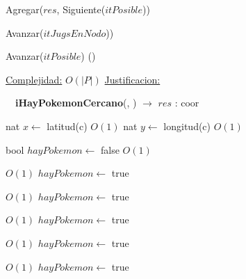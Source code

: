 \begin{Algoritmos}
\begin{algorithm}[H]
\begin{algorithmic}[1]
			\State Agregar($res$, Siguiente($itPosible$))
	
		\EndIf
		
		\State Avanzar($itJugsEnNodo$))
	
	\EndWhile
	
	\State Avanzar($itPosible$)   \Comment()



\EndWhile


\medskip
\State \underline{Complejidad:} $O(|P|)$
\State \underline{Justificacion:} 

\end{algorithmic}
\end{algorithm}


$ $\newline
$ $\newline
$ $\newline
{\textbf{iHayPokemonCercano}(, ) $\to$ $res$ : coor}
\begin{algorithmic}[1]

\State nat $x \gets$ latitud(c)    \Comment $O(1)$
\State nat $y \gets$ longitud(c)   \Comment $O(1)$


\State bool $hayPokemon \gets$ false    \Comment $O(1)$

     \Comment $O(1)$
    \State $hayPokemon \gets$ true
\EndIf

         \Comment $O(1)$
        \State $hayPokemon \gets$ true
    \EndIf


             \Comment $O(1)$
            \State $hayPokemon \gets$ true
        \EndIf

    \EndIf

             \Comment $O(1)$
            \State $hayPokemon \gets$ true
        \EndIf
    \EndIf

             \Comment $O(1)$
            \State $hayPokemon \gets$ true
        \EndIf
    \EndIf

\EndIf



\end{algorithmic}
\end{Algoritmos}
